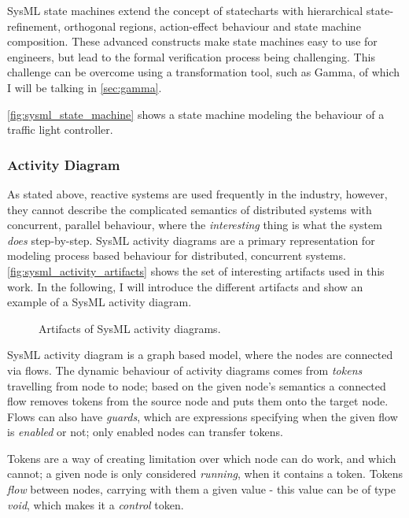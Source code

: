 SysML state machines extend the concept of statecharts with hierarchical state-refinement, orthogonal regions, action-effect behaviour and state machine composition. These advanced constructs make state machines easy to use for engineers, but lead to the formal verification process being challenging. This challenge can be overcome using a transformation tool, such as Gamma, of which I will be talking in \autoref{sec:gamma}.

\autoref{fig:sysml_state_machine} shows a state machine modeling the behaviour of a traffic light controller.

\subsubsection{Activity Diagram}\label{ssec:sysml_activity}

As stated above, reactive systems are used frequently in the industry, however, they cannot describe the complicated semantics of distributed systems with concurrent, parallel behaviour, where the \emph{interesting} thing is what the system \emph{does} step-by-step. SysML activity diagrams are a primary representation for modeling process based behaviour \cite{omg_sysml} for distributed, concurrent systems. \autoref{fig:sysml_activity_artifacts} shows the set of interesting artifacts used in this work. In the following, I will introduce the different artifacts and show an example of a SysML activity diagram.

\begin{figure}[!ht]
	\centering
	
	\caption{Artifacts of SysML activity diagrams.}
	\label{fig:sysml_activity_artifacts}
\end{figure}

SysML activity diagram is a graph based model, where the nodes are connected via flows. The dynamic behaviour of activity diagrams comes from \emph{tokens} travelling from node to node; based on the given node's semantics a connected flow removes tokens from the source node and puts them onto the target node. Flows can also have \emph{guards}, which are expressions specifying when the given flow is \emph{enabled} or not; only enabled nodes can transfer tokens.

Tokens are a way of creating limitation over which node can do work, and which cannot; a given node is only considered \emph{running}, when it contains a token. Tokens \emph{flow} between nodes, carrying with them a given value - this value can be of type \emph{void}, which makes it a \emph{control} token.


